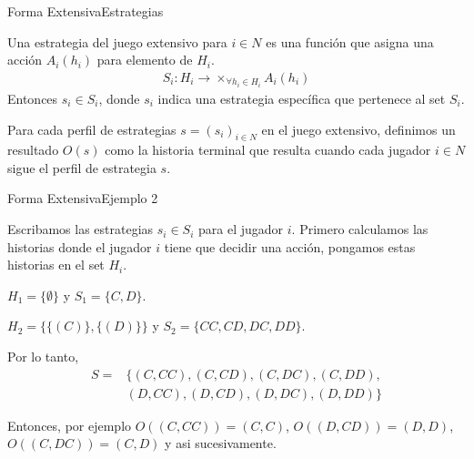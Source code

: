 \documentclass[notes, 11pt]{beamer} %
\newenvironment{wideitemize}{\itemize\addtolength{\itemsep}{10pt}}{\enditemize}
\begin{document}
\begin{frame}{Forma Extensiva}{Estrategias}
\begin{wideitemize}
	\item<2-> Una estrategia del juego extensivo para $i \in N$ es una funci\'on que asigna una acci\'on $A_{i}(h_{i})$ para elemento de $H_{i}$. 
	\begin{align*}
		S_{i} : H_{i} \rightarrow \times_{\forall h_{i} \in H_{i}} A_{i}(h_{i})
	\end{align*} Entonces $s_{i} \in S_{i}$, donde $s_{i}$ indica una estrategia espec\'ifica que pertenece al set $S_{i}$.
	\item<3-> Para cada perfil de estrategias $s = (s_{i})_{i\in N}$ en el juego extensivo, definimos un resultado $O(s)$ como la historia terminal que resulta cuando cada jugador $i \in N$ sigue el perfil de estrategia $s$.
\end{wideitemize}
\end{frame}

\begin{frame}{Forma Extensiva}{Ejemplo 2}
	\begin{wideitemize}
		\item<1-> Escribamos las estrategias $s_{i} \in S_{i}$ para el jugador $i$. Primero calculamos las historias donde el jugador $i$ tiene que decidir una acci\'on, pongamos estas historias en el set $H_{i}$.
		\begin{wideitemize}
			\item<2->[--] $H_{1} = \{ \emptyset \}$ y $S_{1} = \{ C, D \}$.
			\item<3->[--] $H_{2} = \{ \{(C)\}, \{(D)\} \}$ y $S_{2} = \{ CC, CD, DC, DD \}$.
		\end{wideitemize}
		\item<4-> Por lo tanto, 
		\begin{align*}
		S = & \{ (C,CC), (C,CD), (C,DC), (C,DD), \\
		& (D,CC), (D,CD), (D,DC), (D,DD) \}
		\end{align*}
		\item<5-> Entonces, por ejemplo $O( (C,CC) ) = (C,C)$, $O( (D,CD) ) = (D,D)$, $O( (C,DC) ) = (C,D)$ y asi sucesivamente.
	\end{wideitemize}
\end{frame}
\end{document}
